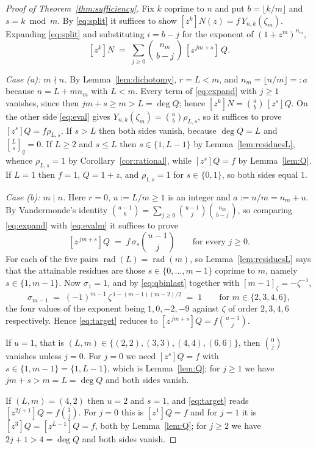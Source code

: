 \documentclass[11pt,a4paper]{article}
\theoremstyle{plain}
\theoremstyle{definition}
\theoremstyle{remark}
\newcommand{\qbin}[2]{\genfrac[]{0pt}{}{#1}{#2}_{q}}
\newcommand{\rad}{\operatorname{rad}}
\begin{document}
\begin{proof}[Proof of Theorem~\textup{\ref{thm:sufficiency}}]
Fix $k$ coprime to $n$ and put $b=\lfloor k/m\rfloor$ and $s=k\bmod m$. By \eqref{eq:split}
it suffices to show $[z^k]N(z)=f\,Y_{n,k}(\zeta_m)$. Expanding \eqref{eq:split} and
substituting $i=b-j$ for the exponent of $(1+z^m)^{n_m}$,
\begin{equation}\label{eq:expand}
  [z^k]N\;=\;\sum_{j\ge0}\binom{n_m}{\,b-j\,}\,[z^{\,jm+s}]\,Q .
\end{equation}

\emph{Case \textup{(a)}: $m\nmid n$.} By Lemma~\ref{lem:dichotomy}, $r=L<m$, and
$n_m=\lfloor n/m\rfloor=:a$ because $n=L+mn_m$ with $L<m$. Every
term of \eqref{eq:expand} with $j\ge1$ vanishes, since then $jm+s\ge m>L=\deg Q$; hence
$[z^k]N=\binom{a}{b}\,[z^{s}]Q$. On the other side \eqref{eq:eval} gives
$Y_{n,k}(\zeta_m)=\binom{a}{b}\rho_{L,s}$, so it suffices to prove $[z^{s}]Q=f\rho_{L,s}$.
If $s>L$ then both sides vanish, because $\deg Q=L$ and $\qbin{L}{s}=0$. If $L\ge2$ and
$s\le L$ then $s\in\{1,L-1\}$ by Lemma~\ref{lem:residuesL}, whence $\rho_{L,s}=1$ by
Corollary~\ref{cor:rational}, while $[z^{s}]Q=f$ by Lemma~\ref{lem:Q}. If $L=1$ then $f=1$, $Q=1+z$, and $\rho_{1,s}=1$ for $s\in\{0,1\}$, so
both sides equal $1$.

\emph{Case \textup{(b)}: $m\mid n$.} Here $r=0$, $u:=L/m\ge1$ is an integer and
$a:=n/m=n_m+u$. By Vandermonde's identity
$\binom{a-1}{b}=\sum_{j\ge0}\binom{u-1}{j}\binom{n_m}{\,b-j\,}$, so comparing
\eqref{eq:expand} with \eqref{eq:evalm} it suffices to prove
\begin{equation}\label{eq:target}
  [z^{\,jm+s}]Q\;=\;f\,\sigma_s\binom{u-1}{j}\qquad\text{for every }j\ge0 .
\end{equation}
For each of the five pairs $\rad(L)=\rad(m)$, so Lemma~\ref{lem:residuesL} says that the
attainable residues are those $s\in\{0,\dots,m-1\}$ coprime to $m$, namely $s\in\{1,m-1\}$.
Now $\sigma_1=1$, and by \eqref{eq:qbinlast} together with $[m-1]_\zeta=-\zeta^{-1}$,
\[
  \sigma_{m-1}\;=\;(-1)^{m-1}\,\zeta^{\,1-(m-1)(m-2)/2}\;=\;1
  \qquad\text{for } m\in\{2,3,4,6\},
\]
the four values of the exponent being $1,0,-2,-9$ against $\zeta$ of order $2,3,4,6$
respectively. Hence \eqref{eq:target} reduces to $[z^{\,jm+s}]Q=f\binom{u-1}{j}$.

If $u=1$, that is $(L,m)\in\{(2,2),(3,3),(4,4),(6,6)\}$, then $\binom{0}{j}$ vanishes unless
$j=0$. For $j=0$ we need $[z^{s}]Q=f$ with $s\in\{1,m-1\}=\{1,L-1\}$, which is
Lemma~\ref{lem:Q}; for $j\ge1$ we have $jm+s>m=L=\deg Q$ and both sides vanish.

If $(L,m)=(4,2)$ then $u=2$ and $s=1$, and \eqref{eq:target} reads
$[z^{2j+1}]Q=f\binom{1}{j}$. For $j=0$ this is $[z^{1}]Q=f$ and for $j=1$ it is
$[z^{3}]Q=[z^{L-1}]Q=f$, both by Lemma~\ref{lem:Q}; for $j\ge2$ we have $2j+1>4=\deg Q$ and
both sides vanish.
\end{proof}
\end{document}
